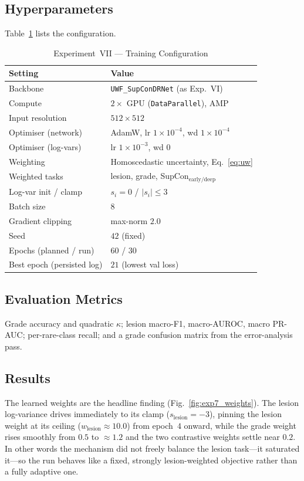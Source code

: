 \documentclass[journal,twoside,web]{ieeecolor}
\begin{document}
\subsection{Hyperparameters}
Table~\ref{tab:exp7_hyper} lists the configuration.

\begin{table}[!t]
\caption{Experiment~VII --- Training Configuration}
\label{tab:exp7_hyper}
\centering
\setlength{\tabcolsep}{5pt}
\begin{tabular}{|l|l|}
\hline
\textbf{Setting} & \textbf{Value} \\
\hline
Backbone & \texttt{UWF\_SupConDRNet} (as Exp.~VI) \\
Compute & $2\times$ GPU (\texttt{DataParallel}), AMP \\
Input resolution & $512\times512$ \\
Optimiser (network) & AdamW, lr $1\times10^{-4}$, wd $1\times10^{-4}$ \\
Optimiser (log-vars) & lr $1\times10^{-3}$, wd $0$ \\
Weighting & Homoscedastic uncertainty, Eq.~\eqref{eq:uw} \\
Weighted tasks & lesion, grade, SupCon$_\text{early/deep}$ \\
Log-var init / clamp & $s_i{=}0$ / $|s_i|\le 3$ \\
Batch size & $8$ \\
Gradient clipping & max-norm $2.0$ \\
Seed & $42$ (fixed) \\
Epochs (planned / run) & $60$ / $30$ \\
Best epoch (persisted log) & $21$ (lowest val loss) \\
\hline
\end{tabular}
\end{table}

\subsection{Evaluation Metrics}
Grade accuracy and quadratic $\kappa$; lesion macro-F1, macro-AUROC, macro PR-AUC;
per-rare-class recall; and a grade confusion matrix from the error-analysis pass.

\subsection{Results}
The learned weights are the headline finding (Fig.~\ref{fig:exp7_weights}). The
lesion log-variance drives immediately to its clamp ($s_\text{lesion}=-3$), pinning
the lesion weight at its ceiling ($w_\text{lesion}\approx10.0$) from epoch~$4$
onward, while the grade weight rises smoothly from $0.5$ to $\approx1.2$ and the two
contrastive weights settle near $0.2$. In other words the mechanism did not
freely balance the lesion task---it saturated it---so the run behaves like a
fixed, strongly lesion-weighted objective rather than a fully adaptive one.
\end{document}
